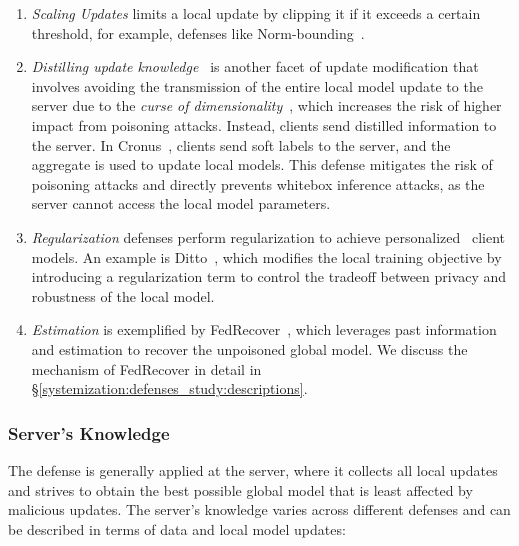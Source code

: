 \begin{enumerate}[leftmargin=*, label=\alph*), wide]
    \item \emph{Scaling Updates} limits a local update by clipping it if it exceeds a certain threshold, for example, defenses like Norm-bounding~\cite{sun2019can, xu2021signguard}.
    \item \emph{Distilling update knowledge~\cite{chang2019cronus, shen2016auror}} is another facet of update modification that involves avoiding the transmission of the entire local model update to the server due to the \emph{curse of dimensionality}~\cite{chang2019cronus}, which increases the risk of higher impact from poisoning attacks. Instead, clients send distilled information to the server. In Cronus~\cite{chang2019cronus}, clients send soft labels to the server, and the aggregate is used to update local models. This defense mitigates the risk of poisoning attacks and directly prevents whitebox inference attacks, as the server cannot access the local model parameters.
    \item \emph{Regularization} defenses perform regularization to achieve personalized~\cite{hanzely2020federated, hanzely2020lower} client models. An example is Ditto~\cite{li2021ditto}, which modifies the local training objective by introducing a regularization term to control the tradeoff between privacy and robustness of the local model.
    \item \emph{Estimation} is exemplified by FedRecover~\cite{cao2022fedrecover}, which leverages past information and estimation to recover the unpoisoned global model. We discuss the mechanism of FedRecover in detail in \S\ref{systemization:defenses_study:descriptions}.
\end{enumerate}
\subsubsection{Server's Knowledge}\label{systemization:classification:knowledge}
The defense is generally applied at the server, where it collects all local updates and strives to obtain the best possible global model that is least affected by malicious updates. The server's knowledge varies across different defenses and can be described in terms of data and local model updates:

